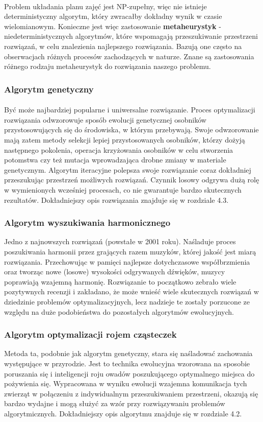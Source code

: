 \paragraph{}Problem układania planu zajęć jest NP-zupełny, więc nie istnieje deterministyczny algorytm, który zwracałby dokładny wynik w czasie wielomianowym. Konieczne jest więc zastosowanie \textbf{metaheurystyk} - niedeterministycznych algorytmów, które wspomagają przeszukiwanie przestrzeni rozwiązań, w celu znalezienia najlepszego rozwiązania. Bazują one często na obserwacjach różnych procesów zachodzących w naturze. Znane są zastosowania różnego rodzaju metaheurystyk do rozwiązania naszego problemu.
\subsubsection{Algorytm genetyczny}
\paragraph{} Być może najbardziej popularne i uniwersalne rozwiązanie. Proces optymalizacji rozwiązania odwzorowuje sposób ewolucji genetycznej osobników przystosowujących się do środowiska, w którym przebywają. Swoje odwzorowanie mają zatem metody selekcji lepiej przystosowanych osobników, którzy dożyją następnego pokolenia, operacja krzyżowania osobników w celu stworzenia potomstwa czy też mutacja wprowadzająca drobne zmiany w materiale genetycznym. Algorytm iteracyjne polepsza swoje rozwiązanie coraz dokładniej przeszukując przestrzeń możliwych rozwiązań. Czynnik losowy odgrywa dużą rolę w wymienionych wcześniej procesach, co nie gwarantuje bardzo skutecznych rezultatów. Dokładniejszy opis rozwiązania znajduje się w rozdziale 4.3.
\subsubsection{Algorytm wyszukiwania harmonicznego}
Jedno z najnowszych rozwiązań (powstałe w 2001 roku). Naśladuje proces poszukiwania harmonii przez grających razem muzyków, której jakość jest miarą rozwiązania. Przechowując w pamięci najlepsze dotychczasowe współbrzmienia oraz tworząc nowe (losowe) wysokości odgrywanych dźwięków, muzycy poprawiają wzajemną harmonię. Rozwiązanie to początkowo zebrało wiele pozytywnych recenzji i zakładano, że może wnieść wiele skutecznych rozwiązań w dziedzinie problemów optymalizacyjnych, lecz nadzieje te zostały porzucone ze względu na duże podobieństwa do pozostałych algorytmów ewolucyjnych.
\subsubsection{Algorytm optymalizacji rojem cząsteczek}
Metoda ta, podobnie jak algorytm genetyczny, stara się naśladować zachowania występujące w przyrodzie. Jest to technika ewolucyjna wzorowana na sposobie poruszania się i inteligencji roju owadów poszukującego optymalnego miejsca do pożywienia się. Wypracowana w wyniku ewolucji wzajemna komunikacja tych zwierząt w połączeniu z indywidualnym przeszukiwaniem przestrzeni, okazują się bardzo wydajne i mogą służyć za wzór przy rozwiązywaniu problemów algorytmicznych. Dokładniejszy opis algorytmu znajduje się w rozdziale 4.2.

